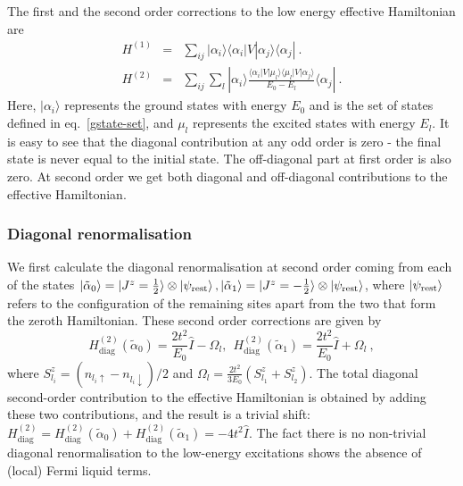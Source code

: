 \documentclass[reprint,prb,superscriptaddress]{revtex4-2}
\begin{document}
The first and the second order corrections to the low energy effective Hamiltonian are
\begin{eqnarray}
H^{(1)} &=& \sum_{ij} |\alpha_i\rangle \langle \alpha_i  | V| \alpha_j \rangle \langle \alpha_j |~.\nonumber\\
H^{(2)} &=& \sum_{ij} \sum_l |\alpha_i\rangle \frac{\langle \alpha_i  | V| \mu_l \rangle \langle \mu_l  | V| \alpha_j \rangle}{E_0-E_{l}}\langle \alpha_j |~.
\end{eqnarray}
Here, $|\alpha_i\rangle$ represents the ground states with energy $E_0$ and is the set of states defined in eq.~\ref{gstate-set}, and $\mu_l$ represents the excited states with energy $E_l$. It is easy to see that the diagonal contribution at any odd order is zero - the final state is never equal to the initial state. The off-diagonal part at first order is also zero. At second order we get both diagonal and off-diagonal contributions to the effective Hamiltonian. 

\subsubsection{Diagonal renormalisation}
We first calculate the diagonal renormalisation at second order coming from each of the states \(\ket{\tilde \alpha_0} = \ket{J^z = \frac{1}{2}}\otimes\ket{\psi_\text{rest}}, \ket{\tilde \alpha_1} = \ket{J^z = -\frac{1}{2}}\otimes\ket{\psi_\text{rest}}\), where \(\ket{\psi_\text{rest}}\) refers to the configuration of the remaining sites apart from the two that form the zeroth Hamiltonian. These second order corrections are given by
\begin{equation}
H^{(2)}_\text{diag}\left(\tilde \alpha_0\right)  = \frac{2t^2}{E_0} \hat{I} - \Omega_l, ~ ~ H^{(2)}_\text{diag}\left(\tilde \alpha_1\right) = \frac{2t^2}{E_0} \hat{I} + \Omega_l ~,
\end{equation}
where $S_{l_i}^z=(n_{l_i\uparrow}-n_{l_i\downarrow})/2$ and $\Omega_l=\frac{2t^2}{3E_0} ( S_{l_1}^z + S_{l_2}^z)$.  The total diagonal second-order contribution to the effective Hamiltonian is obtained by adding these two contributions, and the result is a trivial shift: $H^{(2)}_\text{diag} = H^{(2)}_\text{diag}\left(\tilde \alpha_0\right) + H^{(2)}_\text{diag}\left(\tilde \alpha_1\right) = -4t^2 \hat{I}$. The fact there is no non-trivial diagonal renormalisation to the low-energy excitations shows the absence of (local) Fermi liquid terms.
\end{document}
